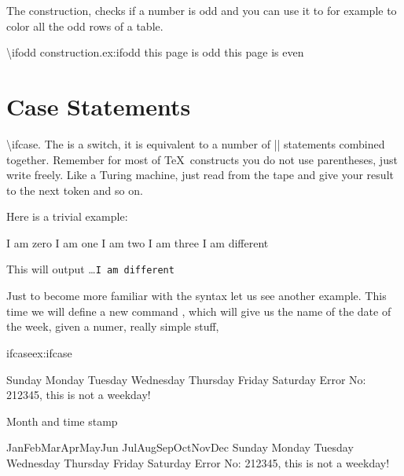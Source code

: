The  construction, checks if a number is odd and you can use it to for example to color 
all the odd rows of a table. 

\begin{texexample}{\textbackslash ifodd construction.}{ex:ifodd}
   \ifodd\thepage  
      this page is odd
   \else
      this page is even   
   \fi
\end{texexample}

\section{Case Statements}


{\textbackslash ifcase.} The  is a switch, it is equivalent to a number of |\ifnum| statements combined together.
Remember for most of \TeX\  constructs you do not use parentheses, just write freely. Like a Turing machine,
just read from the tape and give your result to the next token and so on.

Here is a trivial example:


\begin{teX}
% 
    I am zero      %
   \or I am one    %
   \or I am two    %
   \or I am three  %
   \else 
      I am different 
\fi 
\end{teX}

This will output  \ldots \texttt{I am different}  


Just to become more familiar with the syntax let us see another example. This time we will define
a new command , which will give us the name of the date of the week, given a numer, really simple stuff,


\begin{texexample}{ifcase}{ex:ifcase}
\gdef\weekday#1{
 \ifcase#1
   Sunday          	
   \or Monday    		
   \or Tuesday    	
   \or Wednesday  	
   \or Thursday     
   \or Friday  		
   \or Saturday 		
   \else 
      Error No: 212345, this is not a  weekday!
 \fi\relax} 
\weekday{2}
\end{texexample}



\begin{texexample}{Month and time stamp}{}
\bgroup
\def\monthname{%
  \ifcase\month
    \or Jan\or Feb\or Mar\or Apr\or May\or Jun%
    \or Jul\or Aug\or Sep\or Oct\or Nov\or Dec%
\fi}%

%
%
%
%
%
%
%
%
%
\monthname{5} \weekday{\day} 
\egroup
\end{texexample}

